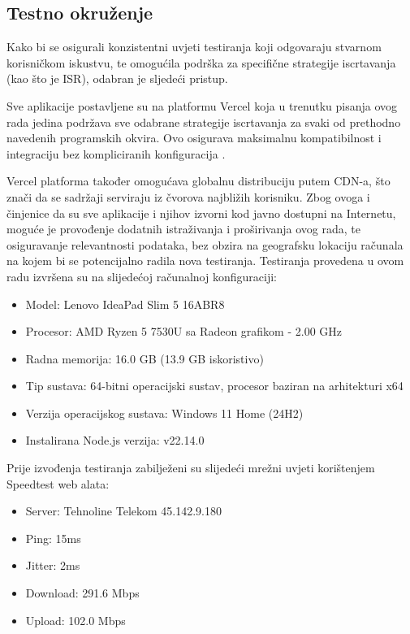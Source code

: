 \subsection{Testno okruženje}

Kako bi se osigurali konzistentni uvjeti testiranja koji odgovaraju stvarnom korisničkom iskustvu, te omogućila podrška za specifične strategije iscrtavanja (kao što je ISR), odabran je sljedeći pristup.

\bigskip

Sve aplikacije postavljene su na platformu Vercel koja u trenutku pisanja ovog rada jedina podržava sve odabrane strategije iscrtavanja za svaki od prethodno navedenih programskih okvira. Ovo osigurava maksimalnu kompatibilnost i integraciju bez kompliciranih konfiguracija \cite{vercelframeworks}.

\bigskip

Vercel platforma također omogućava globalnu distribuciju putem CDN-a, što znači da se sadržaji serviraju iz čvorova najbližih korisniku. Zbog ovoga i činjenice da su sve aplikacije i njihov izvorni kod javno dostupni na Internetu, moguće je provođenje dodatnih istraživanja i proširivanja ovog rada, te osiguravanje relevantnosti podataka, bez obzira na geografsku lokaciju računala na kojem bi se potencijalno radila nova testiranja.
Testiranja provedena u ovom radu izvršena su na slijedećoj računalnoj konfiguraciji:

\bigskip

\begin{itemize}
    \item Model: Lenovo IdeaPad Slim 5 16ABR8
    \item Procesor: AMD Ryzen 5 7530U sa Radeon grafikom - 2.00 GHz
    \item Radna memorija: 16.0 GB (13.9 GB iskoristivo)
    \item Tip sustava: 64-bitni operacijski sustav, procesor baziran na arhitekturi x64
    \item Verzija operacijskog sustava: Windows 11 Home (24H2)
    \item Instalirana Node.js verzija: v22.14.0
\end{itemize}

Prije izvođenja testiranja zabilježeni su slijedeći mrežni uvjeti korištenjem Speedtest web alata:

\begin{itemize}
    \item Server: Tehnoline Telekom 45.142.9.180
    \item Ping: 15ms
    \item Jitter: 2ms
    \item Download: 291.6 Mbps
    \item Upload: 102.0 Mbps
\end{itemize}
